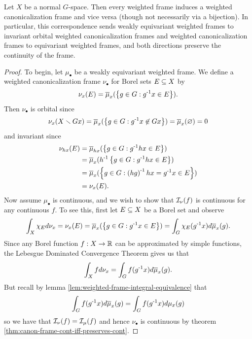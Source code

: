 \begin{theorem}\label{thm:weight-frame-equivalence}
    Let $X$ be a normal $G$-space.
    Then every weighted frame induces a weighted canonicalization frame and vice versa (though not necessarily via a bijection).
    In particular, this correspondence sends weakly equivariant weighted frames to invariant orbital weighted canonicalization frames and weighted canonicalization frames to equivariant weighted frames, and both directions preserve the continuity of the frame.
    \begin{proof}
        To begin, let $\mu_\bullet$ be a weakly equivariant weighted frame.
        We define a weighted canonicalization frame $\nu_\bullet$ for Borel sets $E \subseteq X$ by
        \[
            \nu_x (E)
            = \overline{\mu}_x(\left\{ g \in G : g^{\text{-}1}x \in E \right\}).
        \]
        Then $\nu_\bullet$ is orbital since
        \[
            \nu_x (X \smallsetminus Gx)
            = \overline{\mu}_x(\left\{ g \in G : g^{\text{-}1}x \not\in Gx \right\})
            = \overline{\mu}_x(\varnothing) = 0
        \]
        and invariant since
        \begin{align*}
            \nu_{hx} (E)
            &= \overline{\mu}_{hx}(\left\{ g \in G : g^{\text{-}1}hx \in E \right\}) \\
            &= \overline{\mu}_x(h^{\text{-}1}\left\{ g \in G : g^{\text{-}1}hx \in E \right\}) \\
            &= \overline{\mu}_x(\left\{ g \in G : \left( hg \right)^{\text{-}1}hx = g^{\text{-}1}x \in E \right\}) \\
            &= \nu_x (E).
        \end{align*}
        Now assume $\mu_\bullet$ is continuous, and we wish to show that $\mathcal{I}_\nu (f)$ is continuous for any continuous $f$.
        To see this, first let $E \subseteq X$ be a Borel set and observe
        \[
            \int_X \chi_E d \nu_x
            = \nu_x (E)
            = \overline{\mu}_x (\left\{ g \in G : g^{\text{-}1}x \in E \right\})
            = \int_G \chi_E (g^{\text{-}1} x) d \overline{\mu}_x (g).
        \]
        Since any Borel function $f : X \to \mathbb{R}$ can be approximated by simple functions, the Lebesgue Dominated Convergence Theorem gives us that 
        \[
            \int_X f d\nu_x = \int_G f(g^{\text{-}1} x) d \overline{\mu}_x (g).
        \]
        But recall by lemma \ref{lem:weighted-frame-integral-equivalence} that 
        \[
            \int_G f(g^{\text{-}1} x) d \overline{\mu}_x (g)
            = \int_G f(g^{\text{-}1} x) d \mu_x (g)
        \]
        so we have that $\mathcal{I}_\nu (f) = \mathcal{I}_\mu (f)$ and hence $\nu_\bullet$ is continuous by theorem \ref{thm:canon-frame-cont-iff-preserves-cont}.
        

\end{proof}
\end{theorem}
